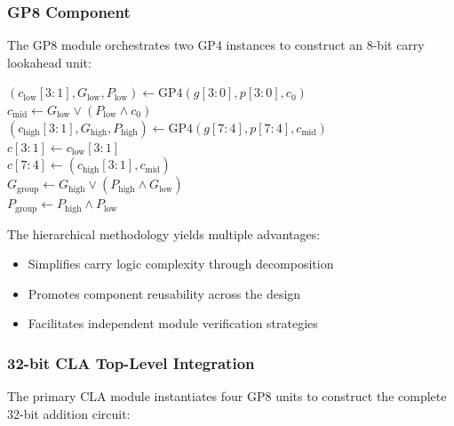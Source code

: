 \documentclass[a4paper, 11pt]{article}
\begin{document}
\subsubsection{GP8 Component}

The GP8 module orchestrates two GP4 instances to construct an 8-bit carry lookahead unit:

\begin{algorithm}[H]
\SetAlgoLined
{}
$(c_{\text{low}}[3:1], G_{\text{low}}, P_{\text{low}}) \gets \text{GP4}(g[3:0], p[3:0], c_0)$\\
$c_{\text{mid}} \gets G_{\text{low}} \lor (P_{\text{low}} \land c_0)$\\
$(c_{\text{high}}[3:1], G_{\text{high}}, P_{\text{high}}) \gets \text{GP4}(g[7:4], p[7:4], c_{\text{mid}})$\\
$c[3:1] \gets c_{\text{low}}[3:1]$\\
$c[7:4] \gets (c_{\text{high}}[3:1], c_{\text{mid}})$\\
$G_{\text{group}} \gets G_{\text{high}} \lor (P_{\text{high}} \land G_{\text{low}})$\\
$P_{\text{group}} \gets P_{\text{high}} \land P_{\text{low}}$\\
\caption{GP8 Component: 8-bit Hierarchical Carry Lookahead}
\end{algorithm}

The hierarchical methodology yields multiple advantages:
\begin{itemize}
    \item Simplifies carry logic complexity through decomposition
    \item Promotes component reusability across the design
    \item Facilitates independent module verification strategies
\end{itemize}

\subsubsection{32-bit CLA Top-Level Integration}

The primary CLA module instantiates four GP8 units to construct the complete 32-bit addition circuit:
\end{document}
